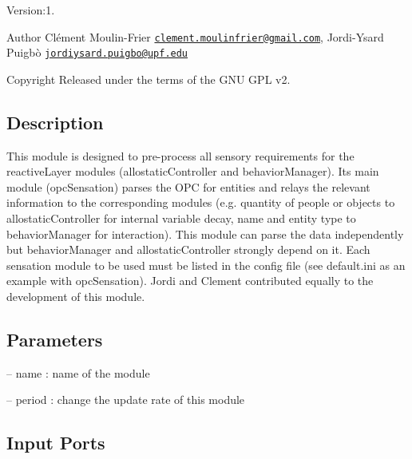 Version\+:1. \begin{DoxyAuthor}{Author}
Clément Moulin-\/\+Frier \href{mailto:clement.moulinfrier@gmail.com}{\tt clement.\+moulinfrier@gmail.\+com}, Jordi-\/\+Ysard Puigbò \href{mailto:jordiysard.puigbo@upf.edu}{\tt jordiysard.\+puigbo@upf.\+edu} ~\newline
 
\end{DoxyAuthor}
\begin{DoxyCopyright}{Copyright}
Released under the terms of the G\+NU G\+PL v2. 
\end{DoxyCopyright}
\hypertarget{group__touchDetector_intro_sec}{}\subsection{Description}\label{group__touchDetector_intro_sec}
This module is designed to pre-\/process all sensory requirements for the reactive\+Layer modules (allostatic\+Controller and behavior\+Manager). It\textquotesingle{}s main module (opc\+Sensation) parses the O\+PC for entities and relays the relevant information to the corresponding modules (e.\+g. quantity of people or objects to allostatic\+Controller for internal variable decay, name and entity type to behavior\+Manager for interaction). This module can parse the data independently but behavior\+Manager and allostatic\+Controller strongly depend on it. Each sensation module to be used must be listed in the config file (see default.\+ini as an example with opc\+Sensation). Jordi and Clement contributed equally to the development of this module.\hypertarget{group__touchDetector_parameters_sec}{}\subsection{Parameters}\label{group__touchDetector_parameters_sec}

\begin{DoxyItemize}
\item -- name \+: name of the module
\item -- period \+: change the update rate of this module 
\end{DoxyItemize}\hypertarget{group__touchDetector_inputports_sec}{}\subsection{Input Ports}\label{group__touchDetector_inputports_sec}

